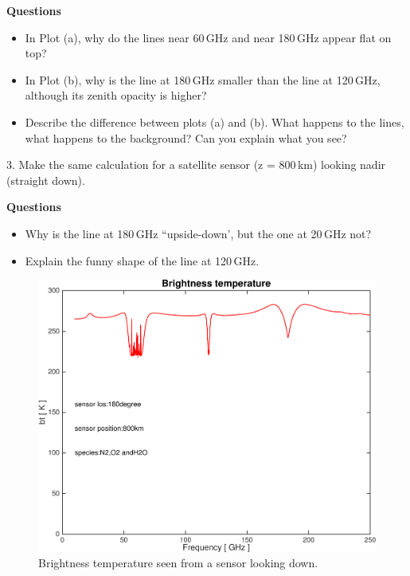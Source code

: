 \documentclass[paper=a4, fontsize=11pt]{scrartcl} %
\begin{document}
\textbf{Questions}
\begin{itemize}
    \item In Plot (a), why do the lines near 60\,GHz and near 180\,GHz appear
        flat on top?
    \item In Plot (b), why is the line at 180\,GHz smaller than the line at
        120\,GHz, although its zenith opacity is higher?
    \item Describe the difference between plots (a) and (b). What happens to
        the lines, what happens to the background? Can you explain what you
        see?
\end{itemize}

\clearpage

3. Make the same calculation for a satellite sensor (z = 800\,km) looking nadir
(straight down).

\textbf{Questions}
\begin{itemize}
  \item Why is the line at 180\,GHz ``upside-down', but the one at 20\,GHz not?
  \item Explain the funny shape of the  line at 120\,GHz.
\end{itemize}

\begin{figure}[h]
\centering
 \includegraphics[width=\textwidth]{plots/bt_N2+O2+H2O_800km_180deg.pdf}
 \caption{Brightness temperature seen from a sensor looking down.}
\end{figure}
\end{document}
